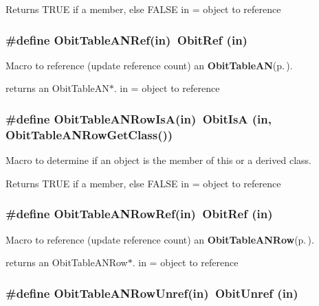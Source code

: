Returns TRUE if a member, else FALSE in = object to reference 
\subsubsection{\setlength{\rightskip}{0pt plus 5cm}\#define Obit\-Table\-ANRef(in)\ Obit\-Ref (in)}\label{ObitTableAN_8h_a2}


Macro to reference (update reference count) an {\bf Obit\-Table\-AN}{\rm (p.\,\pageref{structObitTableAN})}. 

returns an Obit\-Table\-AN$\ast$. in = object to reference 
\subsubsection{\setlength{\rightskip}{0pt plus 5cm}\#define Obit\-Table\-ANRow\-Is\-A(in)\ Obit\-Is\-A (in, Obit\-Table\-ANRow\-Get\-Class())}\label{ObitTableAN_8h_a6}


Macro to determine if an object is the member of this or a derived class. 

Returns TRUE if a member, else FALSE in = object to reference 
\subsubsection{\setlength{\rightskip}{0pt plus 5cm}\#define Obit\-Table\-ANRow\-Ref(in)\ Obit\-Ref (in)}\label{ObitTableAN_8h_a5}


Macro to reference (update reference count) an {\bf Obit\-Table\-ANRow}{\rm (p.\,\pageref{structObitTableANRow})}. 

returns an Obit\-Table\-ANRow$\ast$. in = object to reference 
\subsubsection{\setlength{\rightskip}{0pt plus 5cm}\#define Obit\-Table\-ANRow\-Unref(in)\ Obit\-Unref (in)}\label{ObitTableAN_8h_a4}


